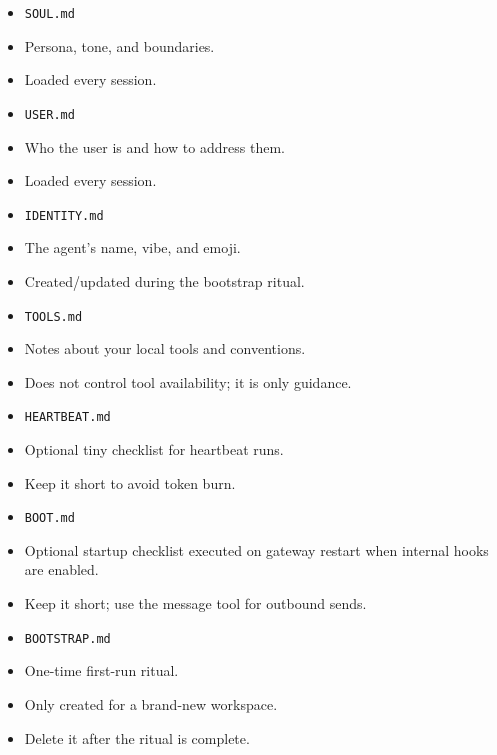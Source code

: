 \begin{itemize}
  \item \texttt{SOUL.md}
  \item Persona, tone, and boundaries.
  \item Loaded every session.
\end{itemize}


\begin{itemize}
  \item \texttt{USER.md}
  \item Who the user is and how to address them.
  \item Loaded every session.
\end{itemize}


\begin{itemize}
  \item \texttt{IDENTITY.md}
  \item The agent's name, vibe, and emoji.
  \item Created/updated during the bootstrap ritual.
\end{itemize}


\begin{itemize}
  \item \texttt{TOOLS.md}
  \item Notes about your local tools and conventions.
  \item Does not control tool availability; it is only guidance.
\end{itemize}


\begin{itemize}
  \item \texttt{HEARTBEAT.md}
  \item Optional tiny checklist for heartbeat runs.
  \item Keep it short to avoid token burn.
\end{itemize}


\begin{itemize}
  \item \texttt{BOOT.md}
  \item Optional startup checklist executed on gateway restart when internal hooks are enabled.
  \item Keep it short; use the message tool for outbound sends.
\end{itemize}


\begin{itemize}
  \item \texttt{BOOTSTRAP.md}
  \item One-time first-run ritual.
  \item Only created for a brand-new workspace.
  \item Delete it after the ritual is complete.
\end{itemize}


